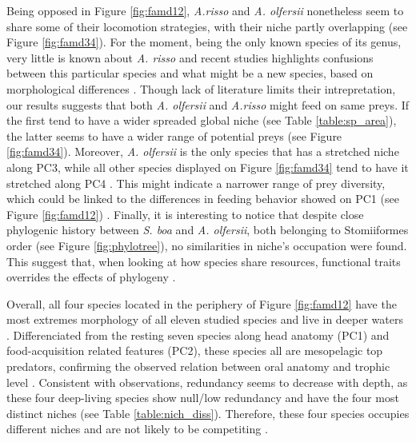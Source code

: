 Being opposed in Figure \ref{fig:famd12}, \textit{A.risso} and \textit{A. olfersii} nonetheless seem to share some of their locomotion strategies, with their niche partly overlapping (see Figure \ref{fig:famd34}). For the moment, being the only known species of its genus, very little is known about \textit{A. risso} and recent studies highlights confusions between this particular species and what might be a new species, based on morphological differences \citep{ho2019}. Though lack of literature limits their intrepretation, our results suggests that both \textit{A. olfersii} and \textit{A.risso} might feed on same preys. If the first tend to have a wider spreaded global niche (see Table \ref{table:sp_area}), the latter seems to have a wider range of potential preys (see Figure \ref{fig:famd34}). Moreover, \textit{A. olfersii} is the only species that has a stretched niche along PC3, while all other species displayed on Figure \ref{fig:famd34} tend to have it stretched along PC4 . This might indicate a narrower range of prey diversity, which could be linked to the differences in feeding behavior showed on PC1 (see Figure \ref{fig:famd12}) . Finally, it is interesting to notice that despite close phylogenic history between \textit{S. boa} and \textit{A. olfersii}, both belonging to Stomiiformes order (see Figure \ref{fig:phylotree}), no similarities in niche's occupation were found. This suggest that, when looking at how species share resources, functional traits overrides the effects of phylogeny \citep{kremer2017}. 

Overall, all four species located in the periphery of Figure \ref{fig:famd12} have the most extremes morphology of all eleven studied species and live in deeper waters \citep{froese2019}. Differenciated from the resting seven species along head anatomy (PC1) and food-acquisition related features (PC2), these species all are mesopelagic top predators, confirming the observed relation between oral anatomy and trophic level \citep{colborne2013,wainwright1995}. Consistent with \citet{farre2016} observations, redundancy seems to decrease with depth, as these four deep-living species show null/low redundancy and have the four most distinct niches (see Table \ref{table:nich_diss}). Therefore, these four species occupies different niches and are not likely to be competiting \citep{mouillot2005}.

